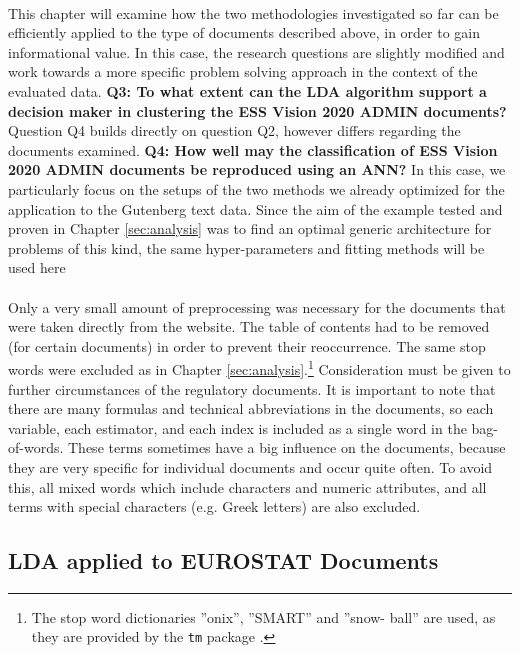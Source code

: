 \documentclass[11pt,a4paper]{article}
\begin{document}
\ \\
This chapter will examine how the two methodologies investigated so far can be efficiently applied to the type of documents described above, in order to gain informational value. In this case, the research questions are slightly modified and work towards a more specific problem solving approach in the context of the evaluated data. \textbf{Q3: To what extent can the LDA algorithm support a decision maker in clustering the ESS Vision 2020 ADMIN documents?} Question Q4 builds directly on question Q2, however differs regarding the documents examined. \textbf{Q4: How well may the classification of ESS Vision 2020 ADMIN documents be reproduced using an ANN?} In this case, we particularly focus on the setups of the two methods we already optimized for the application to the Gutenberg text data. 
Since the aim of the example tested and proven in Chapter \ref{sec:analysis} was to find an optimal generic architecture for problems of this kind, the same hyper-parameters and fitting methods will be used here\\
\ \\
Only a very small amount of preprocessing was necessary for the documents that were taken directly from the website. The table of contents had to be removed (for certain documents) in order to prevent their reoccurrence. The same stop words were excluded as in Chapter \ref{sec:analysis}.\footnote{The stop word dictionaries ”onix”, ”SMART” and ”snow- ball” are used, as they are provided by the \texttt{tm} package \cite{Silge2017}.} Consideration must be given to further circumstances of the regulatory documents. It is important to note that there are many formulas and technical abbreviations in the documents, so each variable, each estimator, and each index is included as a single word in the bag-of-words. These terms sometimes have a big influence on the documents, because they are very specific for individual documents and occur quite often. To avoid this, all mixed words which include characters and numeric attributes, and all terms with special characters (e.g. Greek letters) are also excluded.

\subsection{LDA applied to EUROSTAT Documents} \label{Example2}
\end{document}

